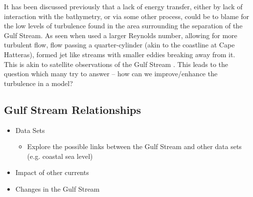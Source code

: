 \documentclass[..\EOYR.tex]{subfiles}
\begin{document}
It has been discussed previously  that a lack of energy transfer, either by lack of interaction with the bathymetry, or via some other process, could be to blame for the low levels of turbulence found in the area surrounding the separation of the Gulf Stream. As seen when \citep{Tansley2001} used a larger Reynolds number, allowing for more turbulent flow, flow passing a quarter-cylinder (akin to the coastline at Cape Hatteras), formed jet like streams with smaller eddies breaking away  from it. This is akin to satellite observations of the Gulf Stream . This leads to the question which many try to answer – how can we improve/enhance the turbulence in a model?   
  
\subsection{Gulf Stream Relationships}
\begin{itemize}
  \item Data Sets    \citep{Ezer2015}
  \begin{itemize}
    \item Explore the possible links between the Gulf Stream and other data sets (e.g. coastal sea level)
  \end{itemize}
  \item Impact of other currents    \citep{Ezer2015}
  \item Changes in the Gulf Stream \citep{Greatbatch1991} \citep{Ezer2015}
\end{itemize}
\end{document}
